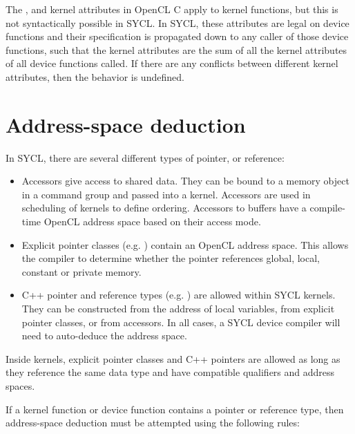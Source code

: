 The ,  and 
kernel attributes in OpenCL C apply to kernel functions, but this is not
syntactically possible in SYCL. In SYCL, these attributes are legal on device
functions and their specification is propagated down to any caller of those
device functions, such that the kernel attributes are the sum of all the kernel
attributes of all device functions called. If there are any conflicts between
different kernel attributes, then the behavior is undefined.

\section{Address-space deduction}

In SYCL, there are several different types of pointer, or reference:
\begin{itemize}
\item Accessors give access to shared data. They can be bound to a memory object
 in a command group and passed into a kernel. Accessors are used in scheduling
 of kernels to define ordering. Accessors to buffers have a compile-time OpenCL
 address space based on their access mode.
\item Explicit pointer classes (e.g. ) contain an OpenCL
 address space. This allows the compiler to determine whether the pointer
 references global, local, constant or private memory.
\item C++ pointer and reference types (e.g. ) are allowed
 within SYCL kernels. They can be constructed from the address of local
 variables, from explicit pointer classes, or from accessors. In all cases, a
 SYCL device compiler will need to auto-deduce the address space.
\end{itemize}

Inside kernels, explicit pointer classes and C++ pointers are allowed as long as
they reference the same data type and have compatible qualifiers and address spaces.

If a kernel function or device function contains a pointer or reference type,
then address-space deduction must be attempted using the following rules:

